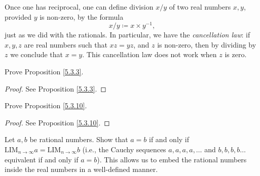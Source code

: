 \begin{note}
Once one has reciprocal, one can define division \(x / y\) of two real numbers \(x, y\), provided \(y\) is non-zero, by the formula
\[
    x / y \coloneqq x \times y^{-1},
\]
just as we did with the rationals.
In particular, we have the \emph{cancellation law}:
if \(x, y, z\) are real numbers such that \(xz = yz\), and \(z\) is non-zero, then by dividing by \(z\) we conclude that \(x = y\).
This cancellation law does not work when \(z\) is zero.
\end{note}

\exercisesection

\begin{exercise}\label{ex 5.3.1}
Prove Proposition \ref{5.3.3}.
\end{exercise}

\begin{proof}
See Proposition \ref{5.3.3}.
\end{proof}

\begin{exercise}\label{ex 5.3.2}
Prove Proposition \ref{5.3.10}.
\end{exercise}

\begin{proof}
See Proposition \ref{5.3.10}.
\end{proof}

\begin{exercise}\label{ex 5.3.3}
Let \(a, b\) be rational numbers.
Show that \(a = b\) if and only if \(\text{LIM}_{n \to \infty} a = \text{LIM}_{n \to \infty} b\) (i.e., the Cauchy sequences \(a, a, a, a, \dots\) and \(b, b, b, b \dots\) equivalent if and only if \(a = b\)).
This allows us to embed the rational numbers inside the real numbers in a well-defined manner.
\end{exercise}

